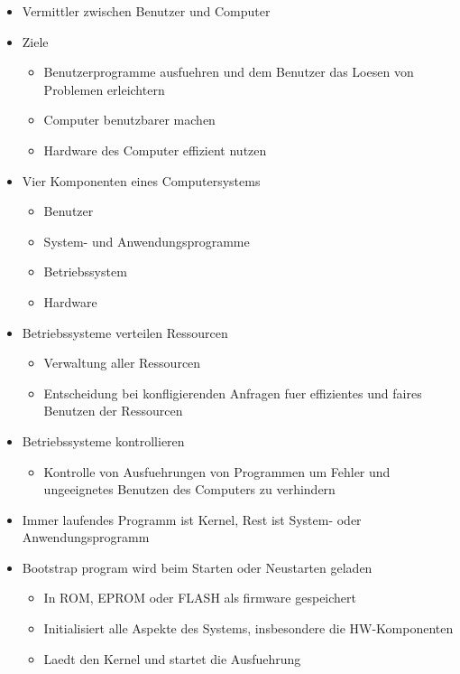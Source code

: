 \documentclass[a4paper]{scrreprt}
\begin{document}
\begin{itemize}
	\item Vermittler zwischen Benutzer und Computer
	\item Ziele
		\begin{itemize}
			\item Benutzerprogramme ausfuehren und dem Benutzer das Loesen von Problemen erleichtern
			\item Computer benutzbarer machen
			\item Hardware des Computer effizient nutzen
		\end{itemize}
	\item Vier Komponenten eines Computersystems
		\begin{itemize}
			\item Benutzer
			\item System- und Anwendungsprogramme
			\item Betriebssystem
			\item Hardware
		\end{itemize}
	\item Betriebssysteme verteilen Ressourcen
		\begin{itemize}
			\item Verwaltung aller Ressourcen
			\item Entscheidung bei konfligierenden Anfragen fuer effizientes und faires Benutzen der Ressourcen
		\end{itemize}
	\item Betriebssysteme kontrollieren
		\begin{itemize}
			\item Kontrolle von Ausfuehrungen von Programmen um Fehler und ungeeignetes Benutzen des Computers zu verhindern
		\end{itemize}
	\item Immer laufendes Programm ist Kernel, Rest ist System- oder Anwendungsprogramm
	\item Bootstrap program wird beim Starten oder Neustarten geladen
		\begin{itemize}
			\item In ROM, EPROM oder FLASH als firmware gespeichert
			\item Initialisiert alle Aspekte des Systems, insbesondere die HW-Komponenten
			\item Laedt den Kernel und startet die Ausfuehrung
		\end{itemize}
\end{itemize}
\end{document}
